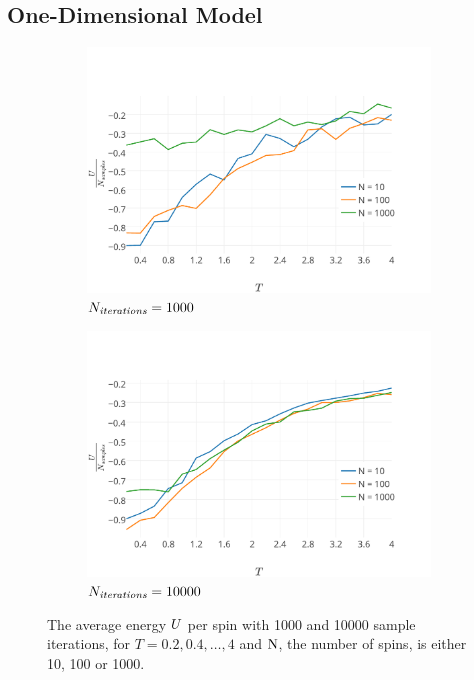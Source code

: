 
\subsection{One-Dimensional Model}


	\begin{figure}
		\centering
		\begin{subfigure}{\columnwidth}
			\centering
			\includegraphics[width=\textwidth, keepaspectratio=true]{img/1D/1DaverageEnergyN1000.pdf}
			\caption{$N_\textit{iterations} = 1000$}
			\label{fig:results:1D:U:1000}
		\end{subfigure}
		\begin{subfigure}{\columnwidth}
			\centering
			\includegraphics[width=\textwidth, keepaspectratio=true]{img/1D/1DaverageEnergyN10000.pdf}
			\caption{$N_\textit{iterations} = 10000$}
			\label{fig:results:1D:U:10000}
		\end{subfigure}	
		\caption{The average energy $U$ per spin with  1000 and  10000 sample iterations, for $T = 0.2, 0.4, \dotsc, 4$ and $\mathrm{N}$, the number of spins, is either 10, 100 or 1000.}
		\label{fig:results:1D:U}
	\end{figure}

